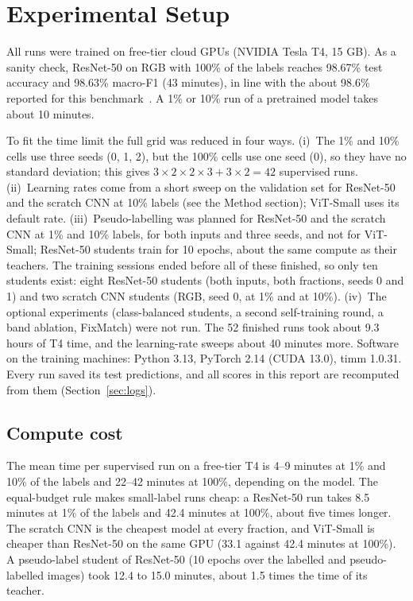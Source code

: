 \documentclass[twoside,a4paper,11pt]{article}
\begin{document}
\section{Experimental Setup}\label{sec:setup}
All runs were trained on free-tier cloud GPUs (NVIDIA Tesla T4, 15 GB). As a sanity check, ResNet-50 on RGB with 100\% of the labels reaches 98.67\% test accuracy and 98.63\% macro-F1 (43 minutes), in line with the about 98.6\% reported for this benchmark~\cite{helber2019eurosat}. A 1\% or 10\% run of a pretrained model takes about 10 minutes.

To fit the time limit the full grid was reduced in four ways. (i)~The 1\% and 10\% cells use three seeds (0, 1, 2), but the 100\% cells use one seed (0), so they have no standard deviation; this gives $3\times2\times2\times3 + 3\times2 = 42$ supervised runs. (ii)~Learning rates come from a short sweep on the validation set for ResNet-50 and the scratch CNN at 10\% labels (see the Method section); ViT-Small uses its default rate. (iii)~Pseudo-labelling was planned for ResNet-50 and the scratch CNN at 1\% and 10\% labels, for both inputs and three seeds, and not for ViT-Small; ResNet-50 students train for 10 epochs, about the same compute as their teachers. The training sessions ended before all of these finished, so only ten students exist: eight ResNet-50 students (both inputs, both fractions, seeds 0 and 1) and two scratch CNN students (RGB, seed 0, at 1\% and at 10\%). (iv)~The optional experiments (class-balanced students, a second self-training round, a band ablation, FixMatch) were not run. The 52 finished runs took about 9.3 hours of T4 time, and the learning-rate sweeps about 40 minutes more. Software on the training machines: Python 3.13, PyTorch 2.14 (CUDA 13.0), timm 1.0.31. Every run saved its test predictions, and all scores in this report are recomputed from them (Section~\ref{sec:logs}).

\subsection{Compute cost}
The mean time per supervised run on a free-tier T4 is 4--9 minutes at 1\% and 10\% of the labels and 22--42 minutes at 100\%, depending on the model. The equal-budget rule makes small-label runs cheap: a ResNet-50 run takes 8.5 minutes at 1\% of the labels and 42.4 minutes at 100\%, about five times longer. The scratch CNN is the cheapest model at every fraction, and ViT-Small is cheaper than ResNet-50 on the same GPU (33.1 against 42.4 minutes at 100\%). A pseudo-label student of ResNet-50 (10 epochs over the labelled and pseudo-labelled images) took 12.4 to 15.0 minutes, about 1.5 times the time of its teacher.
\end{document}
